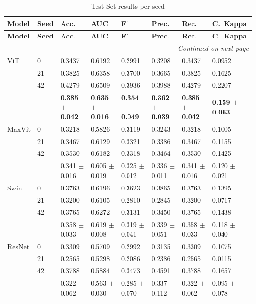 \documentclass[a4paper,10pt]{book}
\begin{document}
\begin{scriptsize}
\begin{longtable}{@{}l p{1.5cm} p{1.5cm} p{1.5cm} p{1.5cm} p{1.5cm} p{1.5cm} p{1.5cm}@{}}
\caption[Test results per seed]{Test Set results per seed}
\label{tab:test_set_results} \\
\toprule
\textbf{Model} & \textbf{Seed} &
\textbf{Acc.} & \textbf{AUC} & \textbf{F1} &
\textbf{Prec.} & \textbf{Rec.} & \textbf{C.\ Kappa}\\
\midrule
\endfirsthead

\toprule
\textbf{Model} & \textbf{Seed} &
\textbf{Acc.} & \textbf{AUC} & \textbf{F1} &
\textbf{Prec.} & \textbf{Rec.} & \textbf{C.\ Kappa}\\
\midrule
\endhead

\midrule
\multicolumn{8}{r}{\textit{Continued on next page}}\\
\midrule
\endfoot

\bottomrule
\endlastfoot
ViT     & 0  & 0.3437 & 0.6192 & 0.2991 & 0.3208 & 0.3437 & 0.0952 \\ 
        & 21 & 0.3825 & 0.6358 & 0.3700 & 0.3665 & 0.3825 & 0.1625 \\ 
        & 42 & 0.4279 & 0.6509 & 0.3936 & 0.3988 & 0.4279 & 0.2207 \\ 
        &    & \textbf{0.385 $\pm$ 0.042} & \textbf{0.635 $\pm$ 0.016} & \textbf{0.354 $\pm$ 0.049} & \textbf{0.362 $\pm$ 0.039} & \textbf{0.385 $\pm$ 0.042} & \textbf{0.159 $\pm$ 0.063} \\ 
MaxVit  & 0  & 0.3218 & 0.5826 & 0.3119 & 0.3243 & 0.3218 & 0.1005 \\ 
        & 21 & 0.3467 & 0.6129 & 0.3321 & 0.3386 & 0.3467 & 0.1155 \\ 
        & 42 & 0.3530 & 0.6182 & 0.3318 & 0.3464 & 0.3530 & 0.1425 \\ 
        &    & 0.341 $\pm$ 0.016 & 0.605 $\pm$ 0.019 & 0.325 $\pm$ 0.012 & 0.336 $\pm$ 0.011 & 0.341 $\pm$ 0.016 & 0.120 $\pm$ 0.021 \\ 
Swin    & 0  & 0.3763 & 0.6196 & 0.3623 & 0.3865 & 0.3763 & 0.1395 \\ 
        & 21 & 0.3200 & 0.6105 & 0.2810 & 0.2845 & 0.3200 & 0.0717 \\ 
        & 42 & 0.3765 & 0.6272 & 0.3131 & 0.3450 & 0.3765 & 0.1438 \\ 
        &    & 0.358 $\pm$ 0.033 & 0.619 $\pm$ 0.008 & 0.319 $\pm$ 0.041 & 0.339 $\pm$ 0.051 & 0.358 $\pm$ 0.033 & 0.118 $\pm$ 0.040 \\ 
ResNet  & 0  & 0.3309 & 0.5709 & 0.2992 & 0.3135 & 0.3309 & 0.1075 \\ 
        & 21 & 0.2565 & 0.5298 & 0.2086 & 0.2386 & 0.2565 & 0.0115 \\ 
        & 42 & 0.3788 & 0.5884 & 0.3473 & 0.4591 & 0.3788 & 0.1657 \\ 
        &    & 0.322 $\pm$ 0.062 & 0.563 $\pm$ 0.030 & 0.285 $\pm$ 0.070 & 0.337 $\pm$ 0.112 & 0.322 $\pm$ 0.062 & 0.095 $\pm$ 0.078 \\ 
\end{longtable}
\end{scriptsize}


\normalsize



\backmatter
{}


\end{document}
